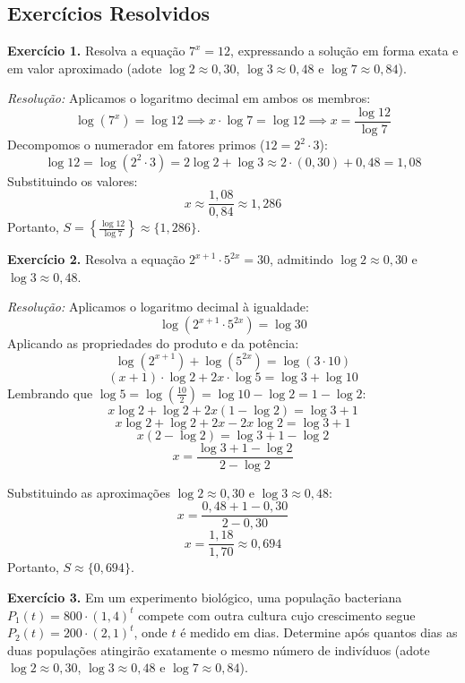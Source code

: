 \documentclass[12pt,a4paper]{report}
\begin{document}
	\subsection*{Exercícios Resolvidos}
	
	\textbf{Exercício 1.} Resolva a equação $7^x = 12$, expressando a solução em forma exata e em valor aproximado (adote $\log 2 \approx 0{,}30$, $\log 3 \approx 0{,}48$ e $\log 7 \approx 0{,}84$).
	
	\textit{Resolução:}  
	Aplicamos o logaritmo decimal em ambos os membros:
	$$\log(7^x) = \log 12 \implies x \cdot \log 7 = \log 12 \implies x = \frac{\log 12}{\log 7}$$
	Decompomos o numerador em fatores primos ($12 = 2^2 \cdot 3$):
	$$\log 12 = \log(2^2 \cdot 3) = 2\log 2 + \log 3 \approx 2 \cdot (0{,}30) + 0{,}48 = 1{,}08$$
	Substituindo os valores:
	$$x \approx \frac{1{,}08}{0{,}84} \approx 1{,}286$$
	Portanto, $S = \left\{\frac{\log 12}{\log 7}\right\} \approx \{1{,}286\}$.
	
	\vspace{0.3cm}
	
	\textbf{Exercício 2.} Resolva a equação $2^{x+1} \cdot 5^{2x} = 30$, admitindo $\log 2 \approx 0{,}30$ e $\log 3 \approx 0{,}48$.
	
	\textit{Resolução:}  
	Aplicamos o logaritmo decimal à igualdade:
	$$\log(2^{x+1} \cdot 5^{2x}) = \log 30$$
	Aplicando as propriedades do produto e da potência:
	$$\log(2^{x+1}) + \log(5^{2x}) = \log(3 \cdot 10)$$
	$$(x + 1) \cdot \log 2 + 2x \cdot \log 5 = \log 3 + \log 10$$
	Lembrando que $\log 5 = \log\left(\frac{10}{2}\right) = \log 10 - \log 2 = 1 - \log 2$:
	$$x \log 2 + \log 2 + 2x(1 - \log 2) = \log 3 + 1$$
	$$x \log 2 + \log 2 + 2x - 2x \log 2 = \log 3 + 1$$
	$$x(2 - \log 2) = \log 3 + 1 - \log 2$$
	$$x=\frac{\log 3 + 1 - \log 2}{2 - \log 2}$$
	
	Substituindo as aproximações $\log 2 \approx 0{,}30$ e $\log 3 \approx 0{,}48$:
	$$x = \frac{0{,}48 + 1 - 0{,}30}{2 - 0{,}30}$$
	$$x = \frac{1{,}18}{1{,}70} \approx 0{,}694$$
	Portanto, $S \approx \{0{,}694\}$.
	
	\vspace{0.3cm}
	
	\textbf{Exercício 3.} Em um experimento biológico, uma população bacteriana $P_1(t) = 800 \cdot (1{,}4)^t$ compete com outra cultura cujo crescimento segue $P_2(t) = 200 \cdot (2{,}1)^t$, onde $t$ é medido em dias. Determine após quantos dias as duas populações atingirão exatamente o mesmo número de indivíduos (adote $\log 2 \approx 0{,}30$, $\log 3 \approx 0{,}48$ e $\log 7 \approx 0{,}84$).
	
\end{document}
